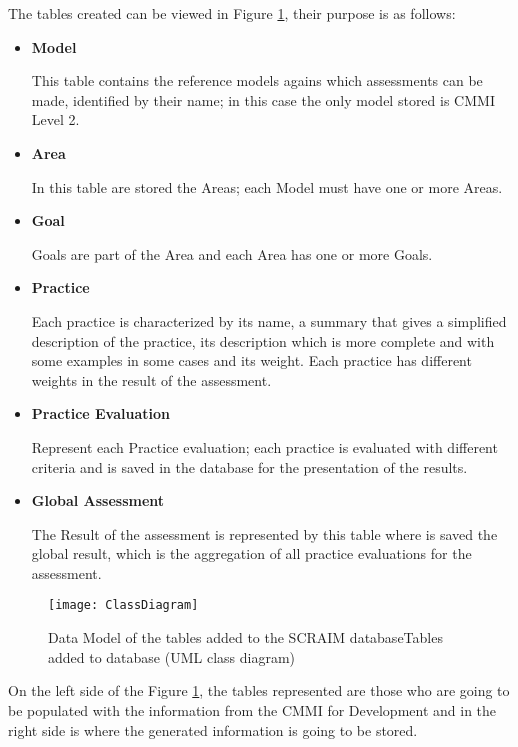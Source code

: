 The tables created can be viewed in Figure \ref{fig:database}, their purpose is as follows:
\begin{itemize}
	\item \textbf{Model}
	
	This table contains the reference models agains which assessments can be made, identified by their name; in this case the only model stored is CMMI Level 2.
	\item \textbf{Area}
	
	In this table are stored the Areas; each Model must have one or more Areas.
	\item \textbf{Goal}
	
	Goals are part of the Area and each Area has one or more Goals.
	\item \textbf{Practice}
	
	Each practice is characterized by its name, a summary that gives a simplified description of the practice, its description which is more complete and with some examples in some cases and its weight. Each practice has different weights in the result of the assessment.
	
	\item \textbf{Practice Evaluation}
	
	Represent each Practice evaluation; each practice is evaluated with different criteria and is saved in the database for the presentation of the results.
	
	\item \textbf{Global Assessment}
	
	The Result of the assessment is represented by this table where is saved the global result, which is the aggregation of all practice evaluations for the assessment.
	
\end{itemize}

\begin{figure}[!htb]
	\begin{center}
		\leavevmode
		\texttt{[image: ClassDiagram]}
		\caption{Data Model of the tables added to the SCRAIM databaseTables added to database (UML class diagram)}
		\label{fig:database}
	\end{center}
\end{figure}


On the left side of the Figure \ref{fig:database}, the tables represented are those who are going to be populated with the information from the CMMI for Development and in the right side is where the generated information is going to be stored.


